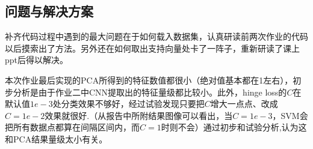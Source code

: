 \documentclass[a4paper]{article}
\begin{document}
\subsection{问题与解决方案}
\quad 补齐代码过程中遇到的最大问题在于如何载入数据集，认真研读前两次作业的代码以后摸索出了方法。另外还在如何取出支持向量处卡了一阵子，重新研读了课上ppt后得以解决。

\quad 本次作业最后实现的PCA所得到的特征数值都很小（绝对值基本都在1左右），初步分析是由于作业二中CNN提取出的特征量级都比较小。此外，hinge loss的$C$在默认值$1e-3$处分类效果不够好，经过试验发现只要把$C$增大一点点、改成$C = 1e-2$效果就很好.（从报告中所附结果图像可以看出，当$C = 1e-3$，SVM会把所有数据点都算在间隔区间内，而$C = 1$时则不会）通过初步和试验分析,认为这和PCA结果量级太小有关。
\end{document}

